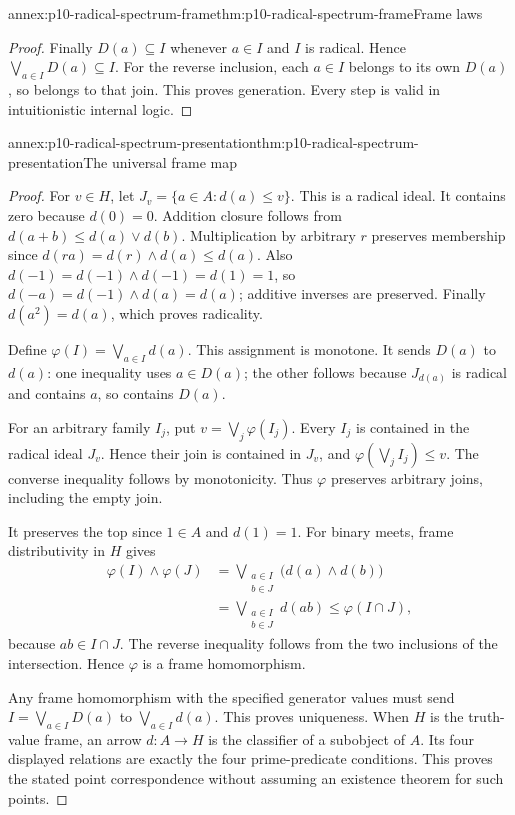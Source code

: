 \begin{annexitem}{annex:p10-radical-spectrum-frame}{thm:p10-radical-spectrum-frame}{Frame laws}
\begin{proof}
Finally \(D(a)\subseteq I\) whenever \(a\in I\) and \(I\)
is radical. Hence \(\bigvee_{a\in I}D(a)\subseteq I\).
For the reverse inclusion, each \(a\in I\) belongs to its own
\(D(a)\), so belongs to that join. This proves generation.
Every step is valid in intuitionistic internal logic.
\end{proof}
\end{annexitem}

\begin{annexitem}{annex:p10-radical-spectrum-presentation}{thm:p10-radical-spectrum-presentation}{The universal frame map}
\begin{proof}
For \(v\in H\), let \(J_v=\{a\in A:d(a)\leq v\}\).
This is a radical ideal. It contains zero because \(d(0)=0\).
Addition closure follows from
\(d(a+b)\leq d(a)\vee d(b)\).
Multiplication by arbitrary \(r\) preserves membership since
\(d(ra)=d(r)\wedge d(a)\leq d(a)\).
Also
\(d(-1)=d(-1)\wedge d(-1)=d(1)=1\), so
\(d(-a)=d(-1)\wedge d(a)=d(a)\); additive inverses are preserved.
Finally \(d(a^2)=d(a)\), which proves radicality.

Define \(\varphi(I)=\bigvee_{a\in I}d(a)\).
This assignment is monotone.
It sends \(D(a)\) to \(d(a)\):
one inequality uses \(a\in D(a)\); the other follows because
\(J_{d(a)}\) is radical and contains \(a\), so contains \(D(a)\).

For an arbitrary family \(I_j\), put \(v=\bigvee_j\varphi(I_j)\).
Every \(I_j\) is contained in the radical ideal \(J_v\).
Hence their join is contained in \(J_v\), and
\(\varphi(\bigvee_j I_j)\leq v\).
The converse inequality follows by monotonicity.
Thus \(\varphi\) preserves arbitrary joins, including the empty join.

It preserves the top since \(1\in A\) and \(d(1)=1\).
For binary meets, frame distributivity in \(H\) gives
\[
 \begin{aligned}
 \varphi(I)\wedge\varphi(J)
 &=\bigvee_{\substack{a\in I\\b\in J}}
       \bigl(d(a)\wedge d(b)\bigr)\\
 &=\bigvee_{\substack{a\in I\\b\in J}}d(ab)
 \leq\varphi(I\cap J),
 \end{aligned}
\]
because \(ab\in I\cap J\).
The reverse inequality follows from the two inclusions of the
intersection. Hence \(\varphi\) is a frame homomorphism.

Any frame homomorphism with the specified generator values must
send \(I=\bigvee_{a\in I}D(a)\) to
\(\bigvee_{a\in I}d(a)\). This proves uniqueness.
When \(H\) is the truth-value frame, an arrow \(d:A\to H\)
is the classifier of a subobject of \(A\).
Its four displayed relations are exactly the four prime-predicate
conditions. This proves the stated point correspondence without
assuming an existence theorem for such points.
\end{proof}
\end{annexitem}
